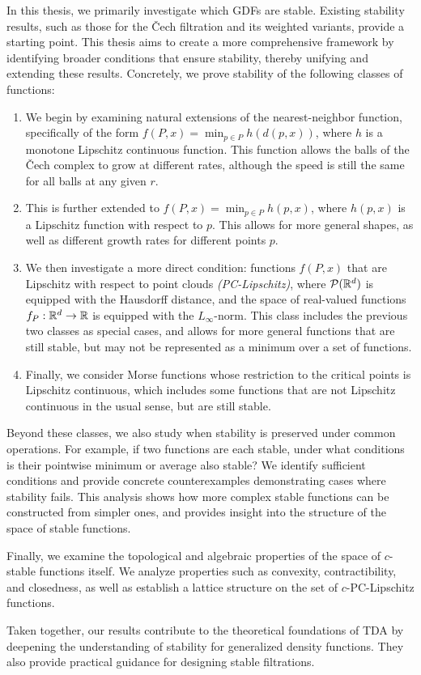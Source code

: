 In this thesis, we primarily investigate which GDFs are stable. Existing
stability results, such as those for the \v{C}ech filtration and its weighted
variants, provide a starting point. This thesis aims to create a more
comprehensive framework by identifying broader conditions that ensure stability,
thereby unifying and extending these results. Concretely, we prove stability of
the following classes of functions:
\begin{enumerate}
    \item We begin by examining natural extensions of the nearest-neighbor
        function, specifically of the form $f(P, x) = \min_{p \in P} h(d(p,
        x))$, where $h$ is a monotone Lipschitz continuous function. This
        function allows the balls of the \v{C}ech complex to grow at different
        rates, although the speed is still the same for all balls at any given
        $r$.
    \item This is further extended to $f(P, x) = \min_{p \in P} h(p, x)$, where
        $h(p, x)$ is a Lipschitz function with respect to $p$. This allows for
        more general shapes, as well as different growth rates for different
        points $p$.
    \item We then investigate a more direct condition: functions $f(P, x)$ that
        are Lipschitz with respect to point clouds \emph{(PC-Lipschitz)}, where
        $\mathcal{P}(\mathbb{R}^d)$ is equipped with the Hausdorff distance, and the
        space of real-valued functions $f_P : \mathbb{R}^d \to \mathbb{R}$ is equipped with the
        $L_\infty$-norm. This class includes the previous two classes as
        special cases, and allows for more general functions that are still
        stable, but may not be represented as a minimum over a set of
        functions.
    \item Finally, we consider Morse functions whose restriction to the critical
        points is Lipschitz continuous, which includes some functions that are
        not Lipschitz continuous in the usual sense, but are still stable.
\end{enumerate}

Beyond these classes, we also study when stability is preserved under common
operations. For example, if two functions are each stable, under what conditions
is their pointwise minimum or average also stable? We identify sufficient
conditions and provide concrete counterexamples demonstrating cases where
stability fails. This analysis shows how more complex stable functions can be
constructed from simpler ones, and provides insight into the structure of the
space of stable functions.

Finally, we examine the topological and algebraic properties of the space of
$c$-stable functions itself. We analyze properties such as convexity,
contractibility, and closedness, as well as establish a lattice structure on the
set of $c$-PC-Lipschitz functions.

Taken together, our results contribute to the theoretical foundations of TDA by
deepening the understanding of stability for generalized density functions. They
also provide practical guidance for designing stable filtrations.


